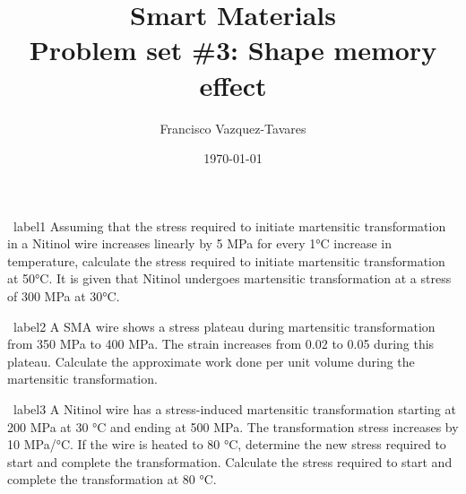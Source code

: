 \documentclass[a4paper]{tufte-handout} %
\title{Smart Materials\\ Problem set \#3: Shape memory effect}
\author{Francisco Vazquez-Tavares}
\date{\today} %
\begin{document}
\maketitle %
\justifying


\begin{prob}{~}{label1}
Assuming that the stress required to initiate martensitic transformation in a Nitinol wire increases linearly by 5 MPa for every 1°C increase in temperature, calculate the stress required to initiate martensitic transformation at 50°C. 
It is given that Nitinol undergoes martensitic transformation at a stress of 300 MPa at 30°C.
\end{prob}

\begin{prob}{~}{label2}
A SMA wire shows a stress plateau during martensitic transformation from 350 MPa to 400 MPa. 
The strain increases from 0.02 to 0.05 during this plateau. 
Calculate the approximate work done per unit volume during the martensitic transformation.
\end{prob}

\begin{prob}{~}{label3}
A Nitinol wire has a stress-induced martensitic transformation starting at 200 MPa at 30 °C and ending at 500 MPa. 
The transformation stress increases by 10 MPa/°C. 
If the wire is heated to 80 °C, determine the new stress required to start and complete the transformation. 
Calculate the stress required to start and complete the transformation at 80 °C.
\end{prob}
\end{document}
